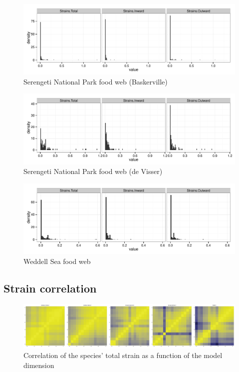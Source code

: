 \documentclass[11pt,article,oneside]{memoir}
\makeatletter
\def\maxwidth{\ifdim\Gin@nat@width>\linewidth\linewidth
\else\Gin@nat@width\fi}
\let\Oldincludegraphics\includegraphics
\renewcommand{\includegraphics}[1]{\Oldincludegraphics[width=\maxwidth]{#1}}
\makeatother
\begin{document}
\begin{figure}[htbp]
\centering
\includegraphics{Images/Distrs/Serengeti_Baskervilledistr.pdf}
\caption{Serengeti National Park food web (Baskerville)}
\end{figure}

\begin{figure}[htbp]
\centering
\includegraphics{Images/Distrs/Serengeti_deVisserdistr.pdf}
\caption{Serengeti National Park food web (de Visser)}
\end{figure}

\begin{figure}[htbp]
\centering
\includegraphics{Images/Distrs/Weddelldistr.pdf}
\caption{Weddell Sea food web}
\end{figure}

\newpage

\subsection{Strain correlation}\label{strain-correlation}

\begin{figure}[htbp]
\centering
\includegraphics{Images/Strains_corr.pdf}
\caption{Correlation of the species' total strain as a function of the
model dimension}
\end{figure}
\end{document}
